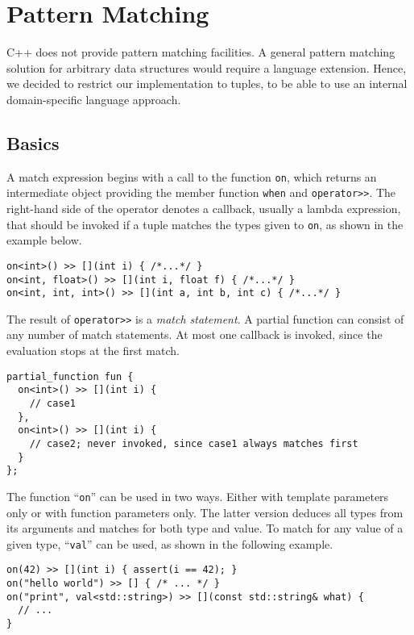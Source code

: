 \section{Pattern Matching}
\label{Sec::PatternMatching}

C++ does not provide pattern matching facilities.
A general pattern matching solution for arbitrary data structures would require a language extension.
Hence, we decided to restrict our implementation to tuples, to be able to use an internal domain-specific language approach.

\subsection{Basics}
\label{Sec::PatternMatching::Basics}

A match expression begins with a call to the function \lstinline^on^, which returns an intermediate object providing the member function \lstinline^when^ and \lstinline^operator>>^.
The right-hand side of the operator denotes a callback, usually a lambda expression, that should be invoked if a tuple matches the types given to \lstinline^on^,
as shown in the example below.

\begin{lstlisting}
on<int>() >> [](int i) { /*...*/ }
on<int, float>() >> [](int i, float f) { /*...*/ }
on<int, int, int>() >> [](int a, int b, int c) { /*...*/ }
\end{lstlisting}

The result of \lstinline^operator>>^ is a \textit{match statement}.
A partial function can consist of any number of match statements.
At most one callback is invoked, since the evaluation stops at the first match.

\begin{lstlisting}
partial_function fun {
  on<int>() >> [](int i) {
    // case1
  },
  on<int>() >> [](int i) {
    // case2; never invoked, since case1 always matches first
  }
};
\end{lstlisting}

The function ``\lstinline^on^'' can be used in two ways.
Either with template parameters only or with function parameters only.
The latter version deduces all types from its arguments and matches for both type and value.
To match for any value of a given type, ``\lstinline^val^'' can be used, as shown in the following example.

\begin{lstlisting}
on(42) >> [](int i) { assert(i == 42); }
on("hello world") >> [] { /* ... */ }
on("print", val<std::string>) >> [](const std::string& what) {
  // ...
}
\end{lstlisting}

